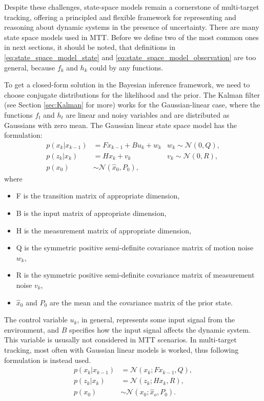 Despite these challenges, state-space models remain a cornerstone of multi-target tracking, offering a principled and flexible framework for representing and reasoning about dynamic systems in the presence of uncertainty.
There are many state space models used in MTT. Before we define two of the most common ones in next sections, it
should be noted, that definitions in \eqref{eq:state_space_model_state} and \eqref{eq:state_space_model_observation} are too general, because $f_k$ and $h_k$ could by any functions.

To get a closed-form solution in the Bayesian inference framework, we need
to choose conjugate distributions for the likelihood and the prior. The Kalman filter (see Section \ref{sec:Kalman} for
more) works for the Gaussian-linear case, where the functions
$f_t$ and $h_t$ are linear and noisy variables and are distributed as Gaussians with zero mean. The Gaussian linear
state space model has the formulation:
\begin{align}
    p(x_k|x_{k-1}) &= Fx_{k-1} + Bu_k + w_k
     &w_k \sim \mathcal{N}(0,Q),\\
    p(z_k|x_k) &= Hx_k + v_k
     &v_k \sim \mathcal{N}(0,R), \\
    p(x_0) &\sim \mathcal{N}(\hat{x}_0, P_0),
\end{align}
where
\begin{itemize}
    \item F is the transition matrix of appropriate dimension,
    \item B is the input matrix of appropriate dimension,
    \item H is the measurement matrix of appropriate dimension,
    \item Q is the symmetric positive semi-definite covariance matrix of
    motion noise $
    w_k$,
    \item R is the symmetric positive semi-definite covariance matrix of
    measurement
    noise $v_k$,
    \item $\hat{x}_0$ and $P_0$ are the mean and the covariance matrix of the prior state.
\end{itemize}
The control variable $u_k$, in general, represents some input signal from the environment, and
$B$ specifies how the input signal affects the dynamic system. This variable is ususally not considered in MTT scenarios.
In multi-target tracking, most often with Gaussian linear models is worked, thus following formulation is instead used.
\begin{align}
    p(x_k|x_{k-1}) &= \mathcal{N}(x_k; Fx_{k-1}, Q),  \\
    p(z_k|x_k) &= \mathcal{N}(z_k;Hx_k,R), \\
    p(x_0) &\sim \mathcal{N}(x_0;\hat{x}_o, P_0).
\end{align}


